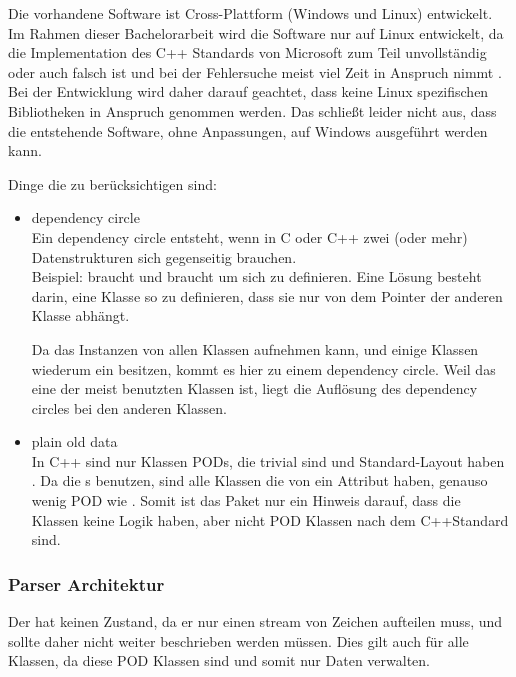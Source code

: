 {      Die vorhandene Software ist Cross-Plattform (Windows und Linux) entwickelt. Im Rahmen dieser Bachelorarbeit wird die Software nur auf Linux entwickelt, da die Implementation des C++ Standards von Microsoft zum Teil unvollständig oder auch falsch ist und bei der Fehlersuche meist viel Zeit in Anspruch nimmt \autocite{new-ms-compiler}. Bei der Entwicklung wird daher darauf geachtet, dass keine Linux spezifischen Bibliotheken in Anspruch genommen werden. Das schließt leider nicht aus, dass die entstehende Software, ohne Anpassungen, auf Windows ausgeführt werden kann.

      Dinge die zu berücksichtigen sind:
      \begin{itemize}
        \item dependency circle\\
          Ein dependency circle entsteht, wenn in C oder C++ zwei (oder mehr) Datenstrukturen sich gegenseitig brauchen.\\
          Beispiel:  braucht  und  braucht  um sich zu definieren. Eine Lösung besteht darin, eine Klasse so zu definieren, dass sie nur von dem Pointer der anderen Klasse abhängt.

          Da das  Instanzen von allen  Klassen aufnehmen kann, und einige Klassen wiederum ein  besitzen, kommt es hier zu einem dependency circle. Weil das  eine der meist benutzten Klassen ist, liegt die Auflösung des dependency circles bei den anderen Klassen.
        \item plain old data\\
          In C++ sind nur Klassen PODs, die trivial sind und Standard-Layout haben \autocite[9 Classes §10]{C++14-std}. Da die s  benutzen, sind alle Klassen die von  ein Attribut haben, genauso wenig POD wie . Somit ist das  Paket nur ein Hinweis darauf, dass die Klassen keine Logik haben, aber nicht POD Klassen nach dem C++Standard sind.
      \end{itemize}

    \subsubsection{Parser Architektur}
    \label{sssec:Parser Architektur}
      Der  hat keinen Zustand, da er nur einen stream von Zeichen aufteilen muss, und sollte daher nicht weiter beschrieben werden müssen. Dies gilt auch für alle  Klassen, da diese POD Klassen sind und somit nur Daten verwalten.

}
